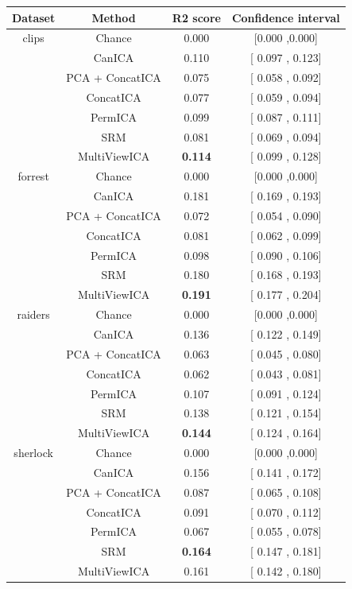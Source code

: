 \begin{table}
    \centering
    \begin{tabular}{|c|c | c | c|}
            \hline
         \textbf{Dataset} & \textbf{Method} & \textbf{R2 score} & \textbf{Confidence interval} \\
         \hline
         clips   & Chance              & 0.000&[0.000 ,0.000] \\
        & CanICA            &  0.110&[ 0.097 , 0.123] \\
        & PCA + ConcatICA              &  0.075&[ 0.058 , 0.092] \\
        & ConcatICA            &  0.077&[ 0.059 , 0.094] \\
        & PermICA             &  0.099&[ 0.087 , 0.111] \\
        & SRM                 &  0.081&[ 0.069 , 0.094] \\
        & MultiViewICA        &  \textbf{0.114}&[ 0.099 , 0.128] \\
        \hline
forrest & Chance              & 0.000&[0.000 ,0.000] \\
        & CanICA            &  0.181&[ 0.169 , 0.193] \\
        & PCA + ConcatICA              &  0.072&[ 0.054 , 0.090] \\
        & ConcatICA            &  0.081&[ 0.062 , 0.099] \\
        & PermICA             &  0.098&[ 0.090 , 0.106] \\
        & SRM                 &  0.180&[ 0.168 , 0.193] \\
        & MultiViewICA        &  \textbf{0.191}&[ 0.177 , 0.204] \\
        \hline
raiders & Chance              & 0.000&[0.000 ,0.000] \\
        & CanICA            &  0.136&[ 0.122 , 0.149] \\
        & PCA + ConcatICA              &  0.063&[ 0.045 , 0.080] \\
        & ConcatICA            &  0.062&[ 0.043 , 0.081] \\
        & PermICA             &  0.107&[ 0.091 , 0.124] \\
        & SRM                 &  0.138&[ 0.121 , 0.154] \\
        & MultiViewICA        &  \textbf{0.144}&[ 0.124 , 0.164] \\
        \hline
sherlock& Chance              & 0.000&[0.000 ,0.000] \\
        & CanICA            &  0.156&[ 0.141 , 0.172] \\
        & PCA + ConcatICA              &  0.087&[ 0.065 , 0.108] \\
        & ConcatICA            &  0.091&[ 0.070 , 0.112] \\
        & PermICA             &  0.067&[ 0.055 , 0.078] \\
        & SRM                 &  \textbf{0.164}&[ 0.147 , 0.181] \\
        & MultiViewICA        &  0.161&[ 0.142 , 0.180] \\
        \hline


\end{tabular}
\end{table}
